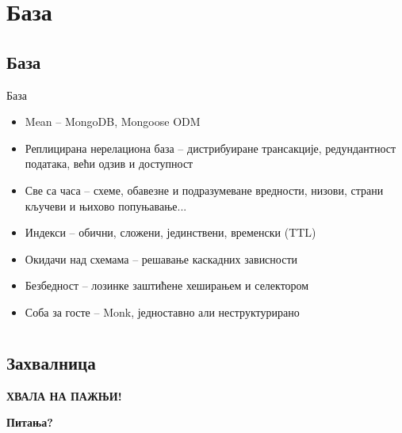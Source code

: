 \documentclass[hyperref={bookmarks=false}]{beamer}
\begin{document}
\section{База}
\subsection{База}
\begin{frame}{База}
\begin{itemize}
\item Mean -- MongoDB, Mongoose ODM

\item Реплицирана нерелациона база --  дистрибуиране трансакције, редундантност података, већи одзив и доступност

\item Све са часа -- схеме, обавезне и подразумеване вредности, низови, страни кључеви и њихово попуњавање...

\item Индекси -- обични, сложени, јединствени, временски (TTL)

\item Окидачи над схемама -- решавање каскадних зависности

\item Безбедност -- лозинке заштићене хеширањем и селектором

\item Соба за госте -- Monk, једноставно али неструктурирано
\end{itemize}
\end{frame}

\section{}
\subsection{Захвалница}
\begin{frame}
\centering \LARGE
\textbf{ХВАЛА НА ПАЖЊИ!}

\textbf{Питања?}
\end{frame}
\end{document}
